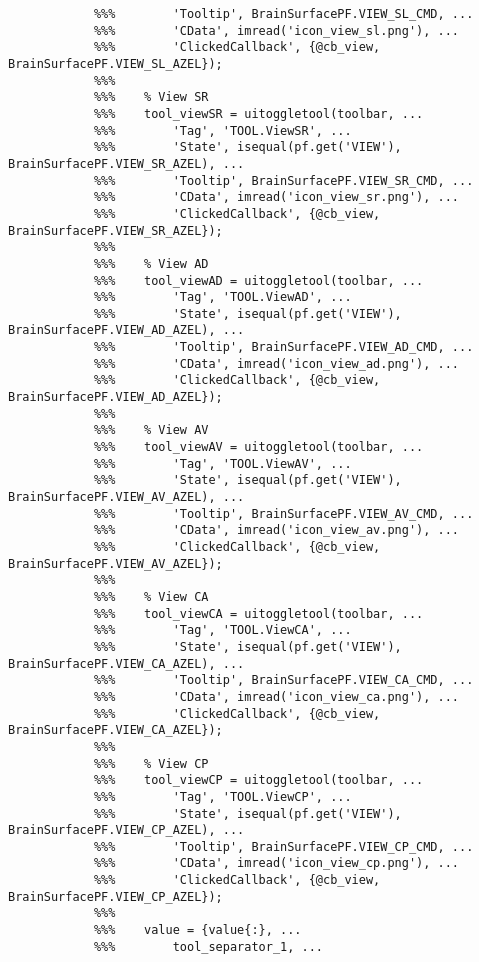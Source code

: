 \documentclass{tufte-handout}
\begin{document}
\begin{lstlisting}
            %%%        'Tooltip', BrainSurfacePF.VIEW_SL_CMD, ...
            %%%        'CData', imread('icon_view_sl.png'), ...
            %%%        'ClickedCallback', {@cb_view, BrainSurfacePF.VIEW_SL_AZEL});
            %%%
            %%%    % View SR
            %%%    tool_viewSR = uitoggletool(toolbar, ...
            %%%        'Tag', 'TOOL.ViewSR', ...
            %%%        'State', isequal(pf.get('VIEW'), BrainSurfacePF.VIEW_SR_AZEL), ...
            %%%        'Tooltip', BrainSurfacePF.VIEW_SR_CMD, ...
            %%%        'CData', imread('icon_view_sr.png'), ...
            %%%        'ClickedCallback', {@cb_view, BrainSurfacePF.VIEW_SR_AZEL});
            %%%
            %%%    % View AD
            %%%    tool_viewAD = uitoggletool(toolbar, ...
            %%%        'Tag', 'TOOL.ViewAD', ...
            %%%        'State', isequal(pf.get('VIEW'), BrainSurfacePF.VIEW_AD_AZEL), ...
            %%%        'Tooltip', BrainSurfacePF.VIEW_AD_CMD, ...
            %%%        'CData', imread('icon_view_ad.png'), ...
            %%%        'ClickedCallback', {@cb_view, BrainSurfacePF.VIEW_AD_AZEL});
            %%%
            %%%    % View AV
            %%%    tool_viewAV = uitoggletool(toolbar, ...
            %%%        'Tag', 'TOOL.ViewAV', ...
            %%%        'State', isequal(pf.get('VIEW'), BrainSurfacePF.VIEW_AV_AZEL), ...
            %%%        'Tooltip', BrainSurfacePF.VIEW_AV_CMD, ...
            %%%        'CData', imread('icon_view_av.png'), ...
            %%%        'ClickedCallback', {@cb_view, BrainSurfacePF.VIEW_AV_AZEL});
            %%%
            %%%    % View CA
            %%%    tool_viewCA = uitoggletool(toolbar, ...
            %%%        'Tag', 'TOOL.ViewCA', ...
            %%%        'State', isequal(pf.get('VIEW'), BrainSurfacePF.VIEW_CA_AZEL), ...
            %%%        'Tooltip', BrainSurfacePF.VIEW_CA_CMD, ...
            %%%        'CData', imread('icon_view_ca.png'), ...
            %%%        'ClickedCallback', {@cb_view, BrainSurfacePF.VIEW_CA_AZEL});
            %%%
            %%%    % View CP
            %%%    tool_viewCP = uitoggletool(toolbar, ...
            %%%        'Tag', 'TOOL.ViewCP', ...
            %%%        'State', isequal(pf.get('VIEW'), BrainSurfacePF.VIEW_CP_AZEL), ...
            %%%        'Tooltip', BrainSurfacePF.VIEW_CP_CMD, ...
            %%%        'CData', imread('icon_view_cp.png'), ...
            %%%        'ClickedCallback', {@cb_view, BrainSurfacePF.VIEW_CP_AZEL});
            %%%    
            %%%    value = {value{:}, ...
            %%%        tool_separator_1, ...

\end{lstlisting}
\end{document}
